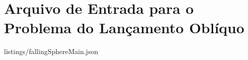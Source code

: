 \chapter{Arquivo de Entrada para o Problema do Lançamento Oblíquo} \label{app:code_listings}


	{listings/fallingSphereMain.json}

